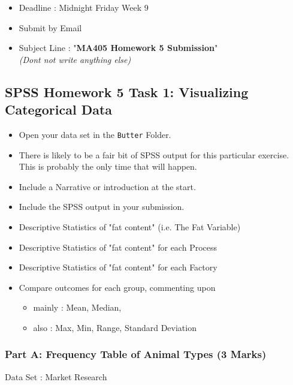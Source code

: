 \documentclass[a4paper,12pt]{article}
\begin{document}
	\begin{framed}
		\begin{itemize}
			\item Deadline : Midnight Friday Week 9
			\item Submit by Email
			\item Subject Line : "\textbf{MA405 Homework 5 Submission}" \\ \textit{(Dont not write anything else)}
		\end{itemize}
	\end{framed}
	
\subsection*{SPSS Homework 5  Task 1: Visualizing Categorical Data}


\begin{itemize}
	\item Open your data set in the \texttt{Butter} Folder.
	\item There is likely to be a fair bit of SPSS output for this particular exercise. This is probably the only time that will happen.
    \item Include a Narrative or introduction at the start.
\end{itemize}


\begin{itemize}
\item Include the SPSS output in your submission.
\item Descriptive Statistics of "fat content" (i.e. The Fat Variable)
\item Descriptive Statistics of "fat content" for each Process
\item Descriptive Statistics of "fat content" for each Factory
\item Compare outcomes for each group,  commenting upon
\begin{itemize}
	\item  mainly : Mean, Median, 
\item also   : Max, Min, Range,  Standard Deviation
\end{itemize}
\end{itemize}
\bigskip
\subsubsection*{Part A: Frequency Table of Animal Types (3 Marks)}
Data Set :  Market Research
\end{document}
